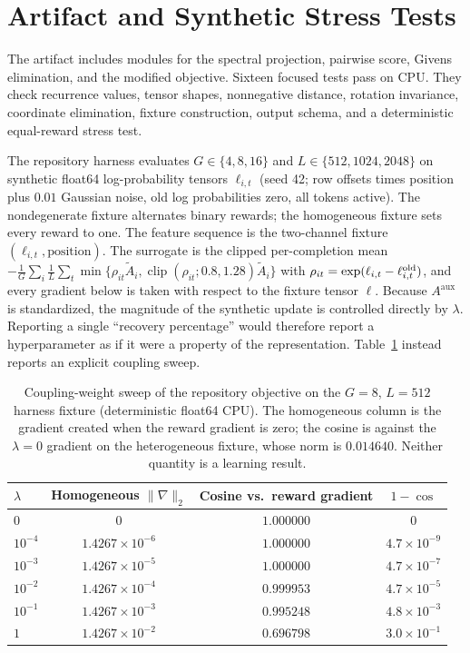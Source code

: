 \documentclass{article}
\begin{document}
\section{Artifact and Synthetic Stress Tests}
\label{sec:artifact}

The artifact includes modules for the spectral projection, pairwise score,
Givens elimination, and the modified objective.  Sixteen focused tests pass on
CPU.  They check recurrence values, tensor shapes, nonnegative distance,
rotation invariance, coordinate elimination, fixture construction, output
schema, and a deterministic equal-reward stress test.

The repository harness evaluates $G\in\{4,8,16\}$ and
$L\in\{512,1024,2048\}$ on synthetic float64 log-probability tensors
$\ell_{i,t}$ (seed 42; row offsets times position plus $0.01$ Gaussian noise,
old log probabilities zero, all tokens active).  The nondegenerate fixture
alternates binary rewards; the homogeneous fixture sets every reward to one.
The feature sequence is the two-channel fixture $(\ell_{i,t},\text{position})$.
The surrogate is the clipped per-completion mean
$-\frac1G\sum_i\frac{1}{L}\sum_t\min\{\rho_{it}\widetilde A_i,
\operatorname{clip}(\rho_{it};0.8,1.28)\widetilde A_i\}$ with
$\rho_{it}=\exp(\ell_{i,t}-\ell^{\rm old}_{i,t})$, and every gradient below is
taken with respect to the fixture tensor $\ell$.  Because
$A^{\mathrm{aux}}$ is standardized, the magnitude of the synthetic update is
controlled directly by $\lambda$.  Reporting a single ``recovery percentage''
would therefore report a hyperparameter as if it were a property of the
representation.  Table~\ref{tab:lambda} instead reports an explicit coupling
sweep.

\begin{table}[t]
\centering
\caption{Coupling-weight sweep of the repository objective on the $G=8$,
$L=512$ harness fixture (deterministic float64 CPU).  The homogeneous column
is the gradient created when the reward gradient is zero; the cosine is
against the $\lambda=0$ gradient on the heterogeneous fixture, whose norm is
$0.014640$.  Neither quantity is a learning result.}
\label{tab:lambda}
\small
\begin{tabular}{lccc}
\toprule
$\lambda$ & Homogeneous $\|\nabla\|_2$ & Cosine vs.\ reward gradient & $1-\cos$ \\
\midrule
$0$       & $0$                     & $1.000000$ & $0$ \\
$10^{-4}$ & $1.4267\times10^{-6}$  & $1.000000$ & $4.7\times10^{-9}$ \\
$10^{-3}$ & $1.4267\times10^{-5}$  & $1.000000$ & $4.7\times10^{-7}$ \\
$10^{-2}$ & $1.4267\times10^{-4}$  & $0.999953$ & $4.7\times10^{-5}$ \\
$10^{-1}$ & $1.4267\times10^{-3}$  & $0.995248$ & $4.8\times10^{-3}$ \\
$1$       & $1.4267\times10^{-2}$  & $0.696798$ & $3.0\times10^{-1}$ \\
\bottomrule
\end{tabular}
\end{table}
\end{document}
